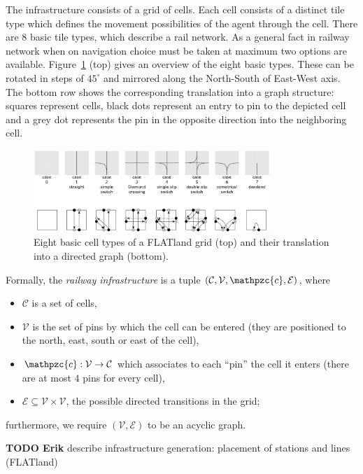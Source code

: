\documentclass{article}
\begin{document}
The infrastructure consists of a grid of cells. Each cell consists of a distinct tile type which defines the movement possibilities of the agent through the cell. There are 8 basic tile types, which describe a rail network. As a general fact in railway network when on navigation choice must be taken at maximum two options are available.
%
Figure~\ref{fig:H1_railway_elements} (top) gives an overview of the eight basic types. These can be rotated in steps of $45^\circ$ and mirrored along the North-South of East-West axis. The bottom row shows the corresponding translation into a graph structure: squares represent cells, black dots represent an entry to pin to the depicted cell and a grey dot represents the pin in the opposite direction into the neighboring cell.
%
\begin{figure}[hbtp]
	\centering
  \includegraphics[width=0.8\textwidth]{H1_railway_elements.png}
	\caption{Eight basic cell types of a FLATland grid (top) and their translation into a directed graph (bottom).}
	\label{fig:H1_railway_elements}
\end{figure}
%
Formally, the \emph{railway infrastructure} is a tuple  $(\mathcal{C}, \mathcal{V}, \mathpzc{c}, \mathcal{E})$, where
\begin{itemize}
    \item $\mathcal{C}$ is a set of cells,
    \item $\mathcal{V}$ is the set of pins by which the cell can be entered (they are positioned to the north, east, south or east of the cell),
    \item $\mathpzc{c}: \mathcal{V} \to \mathcal{C}$ which associates to each ``pin'' the cell it enters (there are at most $4$ pins for every cell),
    \item $\mathcal{E} \subseteq \mathcal{V} \times \mathcal{V}$, the possible directed transitions in the grid;
\end{itemize}
furthermore, we require $(\mathcal{V},\mathcal{E})$ to be an acyclic graph.



\begin{mdframed}
{\bf TODO Erik} describe infrastructure generation: placement of stations and lines (FLATland)
\end{mdframed}
\end{document}
